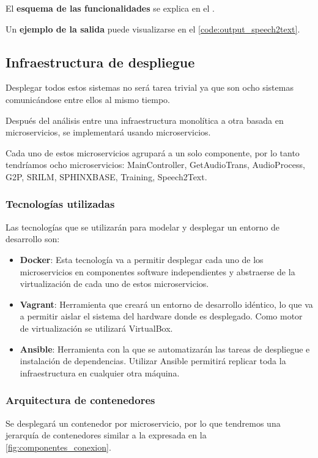 \documentclass[../main.tex]{subfiles}
\begin{document}
El \textbf{esquema de las funcionalidades} se explica en el .

Un \textbf{ejemplo de la salida} puede visualizarse en el \autoref{code:output_speech2text}.



\subsection{Infraestructura de despliegue}\label{subsec:impl_infraestructura}
Desplegar todos estos sistemas no será tarea trivial ya que son ocho sistemas comunicándose entre ellos al mismo tiempo.

Después del análisis entre una infraestructura monolítica a otra basada en microservicios, se implementará usando microservicios.

Cada uno de estos microservicios agrupará a un solo componente, por lo tanto tendríamos ocho microservicios: MainController, GetAudioTrans, AudioProcess, G2P, SRILM, SPHINXBASE, Training, Speech2Text.

\subsubsection{Tecnologías utilizadas}\label{subsubsec:tecnologia}
Las tecnologías que se utilizarán para modelar y desplegar un entorno de desarrollo son:
\begin{itemize}
    \item \textbf{Docker}: Esta tecnología va a permitir desplegar cada uno de los microservicios en componentes software independientes y abstraerse de la virtualización de cada uno de estos microservicios.
    \item \textbf{Vagrant}: Herramienta que creará un entorno de desarrollo idéntico, lo que va a permitir aislar el sistema del hardware donde es desplegado. Como motor de virtualización se utilizará VirtualBox.
    \item \textbf{Ansible}: Herramienta con la que se automatizarán las tareas de despliegue e instalación de dependencias. Utilizar Ansible permitirá replicar toda la infraestructura en cualquier otra máquina.
\end{itemize}

\subsubsection{Arquitectura de contenedores}\label{subsubsec:arq-contenedores}
Se desplegará un contenedor por microservicio, por lo que tendremos una jerarquía de contenedores similar a la expresada en la \autoref{fig:componentes_conexion}.
\end{document}
